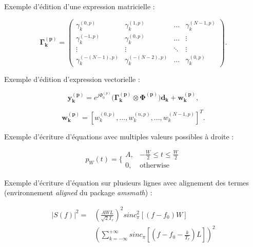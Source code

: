 \documentclass[11pt,a4paper,french]{article}
\begin{document}
Exemple d'édition d'une expression matricielle :

\begin{equation}
\mathbf{\Gamma_k^{(p)}} = 
\left(
\begin{array}{cccc}
	\gamma_{k}^{(0, p)} 		&\gamma_{k}^{(1, p)} 			&\ldots &\gamma_{k}^{(N-1, p)} \\
	\gamma_{k}^{(-1, p)}		&\gamma_{k}^{(0, p)} 			&\ldots &\vdots								 \\
	\vdots              		&\vdots              			&\ddots &\vdots                \\
	\gamma_{k}^{(-(N-1), p)}&\gamma_{k}^{(-(N-2), p)}	&\ldots &\gamma_{k}^{(0, p)}
\end{array}
\right).
\end{equation}

Exemple d'édition d'expression vectorielle :

\begin{equation}
\label{E_RX_DETECT_DP3M}
\mathbf{y_k^{(p)}} = e^{j\Phi_0^{(p)}}\big(\mathbf{\Gamma_k^{(p)}}\otimes \mathbf{\Phi^{(p)}}\big)\mathbf{d_k} + \mathbf{w_k^{(p)}},
\end{equation}

\begin{equation}
\label{E_RX_WK_VECT}
\mathbf{w_k^{(p)}} = [w_k^{(0,p)},...,w_k^{(n,p)},...,w_k^{(N-1,p)}]^T.
\end{equation}

Exemple d'écriture d'équations avec multiples valeurs possibles à droite :

\begin{equation}
\label{E_PULSE}
p_W(t)= 
\{
\begin{array}{cc}
A,  &-\frac{W}{2} \leq t \leq \frac{W}{2}\\
0,  &\text{otherwise}
\end{array}
\end{equation}

Exemple d'écriture d'équation sur plusieurs lignes avec alignement des termes (environnement \emph{aligned} du package \emph{amsmath}) :

\begin{equation}
\label{E_MOD_PULSE_FIN_TRAIN_SED}
\begin{aligned}
|S(f)|^2 = &(\frac{AWL}{\sqrt{2}T_r})^2sinc_{\pi}^2[(f-f_0)W]\\
&(\sum_{k=-\infty}^{+\infty}sinc_{\pi}[(f-f_0-\frac{k}{T_r})L])^2
\end{aligned}
\end{equation}
\end{document}
